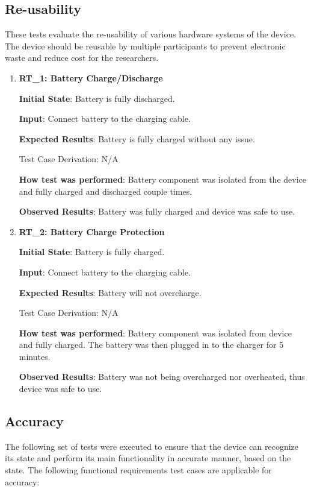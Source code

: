 \documentclass[12pt, titlepage]{article}
\begin{document}
\subsection{Re-usability}

These tests evaluate the re-usability of various hardware systems of the device. The device should be reusable by multiple participants to prevent electronic waste and reduce cost for the researchers.

\begin{enumerate}


  \item{\textbf{RT\_1: Battery Charge/Discharge}}\label{RT1}

  \textbf{Initial State}: Battery is fully discharged.

  \textbf{Input}: Connect battery to the charging cable.

  \textbf{Expected Results}: Battery is fully charged without any issue.

  Test Case Derivation: N/A

  \textbf{How test was performed}: Battery component was isolated from the device and fully charged and discharged couple times.

  \textbf{Observed Results}: Battery was fully charged and device was safe to use.\\

  \item{\textbf{RT\_2: Battery Charge Protection}}\label{RT2}

  \textbf{Initial State}: Battery is fully charged.

  \textbf{Input}: Connect battery to the charging cable.

  \textbf{Expected Results}: Battery will not overcharge.

  Test Case Derivation: N/A

  \textbf{How test was performed}: Battery component was isolated from device and fully charged. The battery was then plugged in to the charger for 5 minutes.

  \textbf{Observed Results}: Battery was not being overcharged nor overheated, thus device was safe to use.

\end{enumerate}

\subsection{Accuracy}
The following set of tests were executed to ensure that the device can recognize its state and perform its main functionality in accurate manner, based on the state.
The following functional requirements test cases are applicable for accuracy:
\end{document}
